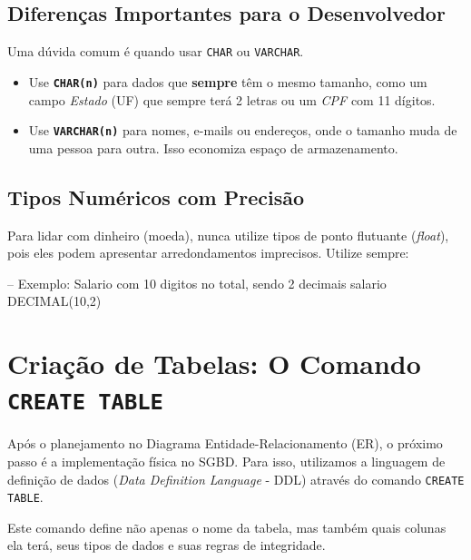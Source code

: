 \documentclass[12pt,a4paper,openright]{book}
\begin{document}
\subsection{Diferenças Importantes para o Desenvolvedor}

\begin{tcolorbox}[colback=blue!5,colframe=blue!40!black,title=Dica do Professor: CHAR vs VARCHAR]
Uma dúvida comum é quando usar \texttt{CHAR} ou \texttt{VARCHAR}. 
\begin{itemize}
    \item Use \textbf{\texttt{CHAR(n)}} para dados que \textbf{sempre} têm o mesmo tamanho, como um campo \textit{Estado} (UF) que sempre terá 2 letras ou um \textit{CPF} com 11 dígitos.
    \item Use \textbf{\texttt{VARCHAR(n)}} para nomes, e-mails ou endereços, onde o tamanho muda de uma pessoa para outra. Isso economiza espaço de armazenamento.
\end{itemize}
\end{tcolorbox}



\subsection{Tipos Numéricos com Precisão}

Para lidar com dinheiro (moeda), nunca utilize tipos de ponto flutuante (\textit{float}), pois eles podem apresentar arredondamentos imprecisos. Utilize sempre:

\begin{sqlcode}
-- Exemplo: Salario com 10 digitos no total, sendo 2 decimais
salario DECIMAL(10,2)
\end{sqlcode}

\vspace{0.5cm}
 
\section{Criação de Tabelas: O Comando \texttt{CREATE TABLE}}

Após o planejamento no Diagrama Entidade-Relacionamento (ER), o próximo passo é a implementação física no SGBD. Para isso, utilizamos a linguagem de definição de dados (\textit{Data Definition Language} - DDL) através do comando \texttt{CREATE TABLE}.

Este comando define não apenas o nome da tabela, mas também quais colunas ela terá, seus tipos de dados e suas regras de integridade.
\end{document}
